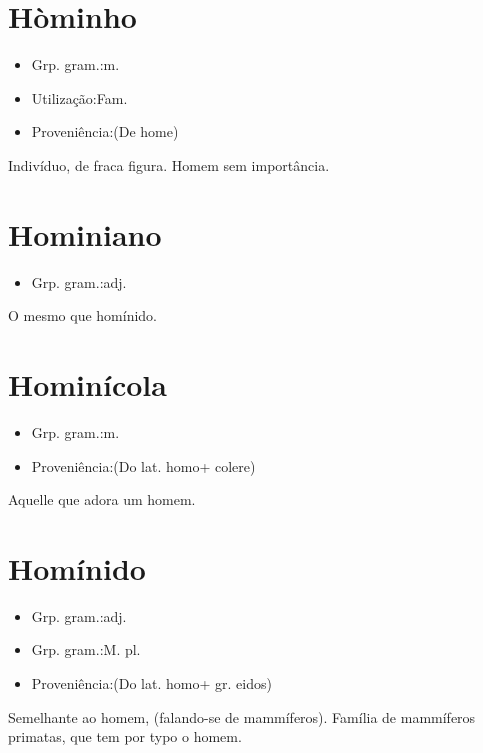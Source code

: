 \documentclass{article}
\begin{document}
\section{Hòminho}
\begin{itemize}
\item {Grp. gram.:m.}
\end{itemize}
\begin{itemize}
\item {Utilização:Fam.}
\end{itemize}
\begin{itemize}
\item {Proveniência:(De \textunderscore home\textunderscore )}
\end{itemize}
Indivíduo, de fraca figura.
Homem sem importância.
\section{Hominiano}
\begin{itemize}
\item {Grp. gram.:adj.}
\end{itemize}
O mesmo que \textunderscore homínido\textunderscore .
\section{Hominícola}
\begin{itemize}
\item {Grp. gram.:m.}
\end{itemize}
\begin{itemize}
\item {Proveniência:(Do lat. \textunderscore homo\textunderscore  + \textunderscore colere\textunderscore )}
\end{itemize}
Aquelle que adora um homem.
\section{Homínido}
\begin{itemize}
\item {Grp. gram.:adj.}
\end{itemize}
\begin{itemize}
\item {Grp. gram.:M. pl.}
\end{itemize}
\begin{itemize}
\item {Proveniência:(Do lat. \textunderscore homo\textunderscore  + gr. \textunderscore eidos\textunderscore )}
\end{itemize}
Semelhante ao homem, (falando-se de mammíferos).
Família de mammíferos primatas, que tem por typo o homem.
\end{document}

